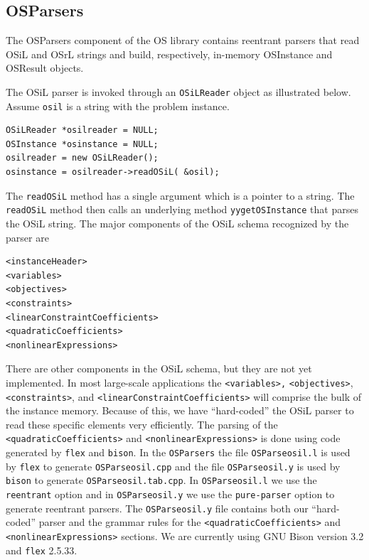 \documentclass[11pt]{article}
\renewcommand{\_}{{\char"5F}}
\renewcommand{\{}{{\char"7B}}
\renewcommand{\}}{{\char"7D}}
\renewcommand{\^}{{\char"0D}}
\renewcommand{\'}{{\char"0D}}
\begin{document}
\begin{enumerate}[Step 1:]
\subsection{OSParsers}\label{section:osparsers}

The OSParsers component of the OS library contains reentrant parsers that  read OSiL and OSrL 
strings and build, respectively, in-memory OSInstance and OSResult  objects.


The OSiL parser is invoked through an {\tt OSiLReader} object as illustrated below. Assume {\tt osil} is a string with the problem instance.
\begin{verbatim}
OSiLReader *osilreader = NULL;
OSInstance *osinstance = NULL;
osilreader = new OSiLReader();
osinstance = osilreader->readOSiL( &osil);
\end{verbatim}
The {\tt  readOSiL} method  has a single argument which is a pointer to a string. The {\tt  readOSiL} method then calls an underlying method {\tt yygetOSInstance} that parses the OSiL string. The major components of the OSiL schema  recognized by the parser are
\begin{verbatim}
<instanceHeader>
<variables>
<objectives>
<constraints>
<linearConstraintCoefficients>
<quadraticCoefficients>
<nonlinearExpressions>
\end{verbatim}
There are other components in the OSiL schema, but they are not yet implemented.
In most large-scale applications the {\tt <variables>,} {\tt <objectives>}, {\tt <constraints>}, and {\tt <linearConstraintCoefficients>}
will comprise the bulk of the instance memory.  Because of this, we have ``hard-coded'' the OSiL parser 
to read these specific elements very efficiently.
The parsing of the {\tt <quadraticCoefficients>} and {\tt <nonlinearExpressions>} is done using code generated 
by {\tt flex} and {\tt bison}. In the {\tt OSParsers}  the file  {\tt OSParseosil.l} 
is used by {\tt flex} to generate {\tt OSParseosil.cpp} and the file {\tt OSParseosil.y} is used by 
{\tt bison} to generate {\tt OSParseosil.tab.cpp}.
In {\tt OSParseosil.l} we use the {\tt reentrant} option and in {\tt OSParseosil.y} we use the 
{\tt pure-parser} option to generate reentrant parsers. The {\tt OSParseosil.y} file  contains both our  
``hard-coded'' parser and the grammar rules for the  {\tt <quadraticCoefficients>} and 
{\tt <nonlinearExpressions>} sections.
We are currently using GNU Bison version 3.2 and {\tt flex} 2.5.33.


\end{enumerate}
\end{document}
